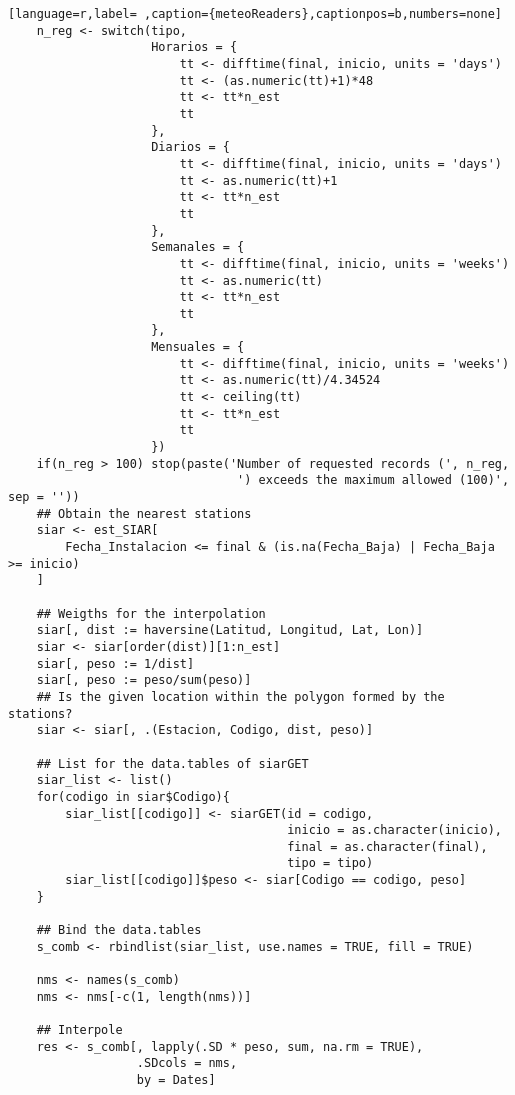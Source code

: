 \begin{lstlisting}[language=r,label= ,caption={meteoReaders},captionpos=b,numbers=none]
    n_reg <- switch(tipo,
                    Horarios = {
                        tt <- difftime(final, inicio, units = 'days')
                        tt <- (as.numeric(tt)+1)*48
                        tt <- tt*n_est
                        tt
                    },
                    Diarios = {
                        tt <- difftime(final, inicio, units = 'days')
                        tt <- as.numeric(tt)+1
                        tt <- tt*n_est
                        tt
                    },
                    Semanales = {
                        tt <- difftime(final, inicio, units = 'weeks')
                        tt <- as.numeric(tt)
                        tt <- tt*n_est
                        tt
                    },
                    Mensuales = {
                        tt <- difftime(final, inicio, units = 'weeks')
                        tt <- as.numeric(tt)/4.34524
                        tt <- ceiling(tt)
                        tt <- tt*n_est
                        tt
                    })
    if(n_reg > 100) stop(paste('Number of requested records (', n_reg,
                                ') exceeds the maximum allowed (100)', sep = ''))
    ## Obtain the nearest stations
    siar <- est_SIAR[
        Fecha_Instalacion <= final & (is.na(Fecha_Baja) | Fecha_Baja >= inicio)
    ]

    ## Weigths for the interpolation
    siar[, dist := haversine(Latitud, Longitud, Lat, Lon)]
    siar <- siar[order(dist)][1:n_est]
    siar[, peso := 1/dist]
    siar[, peso := peso/sum(peso)]
    ## Is the given location within the polygon formed by the stations?
    siar <- siar[, .(Estacion, Codigo, dist, peso)]

    ## List for the data.tables of siarGET
    siar_list <- list()
    for(codigo in siar$Codigo){
        siar_list[[codigo]] <- siarGET(id = codigo,
                                       inicio = as.character(inicio),
                                       final = as.character(final),
                                       tipo = tipo)
        siar_list[[codigo]]$peso <- siar[Codigo == codigo, peso]
    }

    ## Bind the data.tables
    s_comb <- rbindlist(siar_list, use.names = TRUE, fill = TRUE)

    nms <- names(s_comb)
    nms <- nms[-c(1, length(nms))]

    ## Interpole
    res <- s_comb[, lapply(.SD * peso, sum, na.rm = TRUE),
                  .SDcols = nms,
                  by = Dates]


\end{lstlisting}
